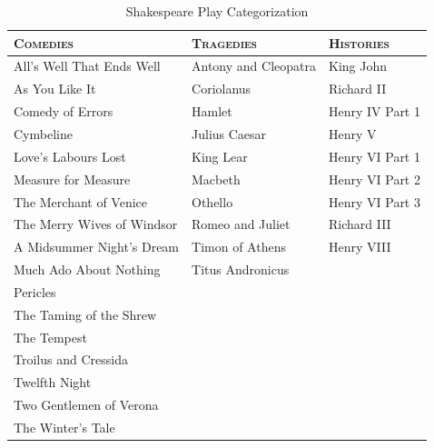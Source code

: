 \documentclass[12pt]{article} %
\begin{document}
\begin{center}
\begin{table}
\centering

\begin{tabular}{|l|l|l|}
  \hline
 \textsc{Comedies} & \textsc{Tragedies} & \textsc{Histories}\\
  \hline
  All's Well That Ends Well &  Antony and Cleopatra \hspace{8 mm} & King John \hspace{17 mm} \\

  As You Like It & Coriolanus & Richard II\\

  Comedy of Errors & Hamlet & Henry IV Part 1\\

  Cymbeline & Julius Caesar & Henry V\\

  Love's Labours Lost & King Lear & Henry VI Part 1\\

  Measure for Measure & Macbeth & Henry VI Part 2\\

  The Merchant of Venice & Othello & Henry VI Part 3\\

  The Merry Wives of Windsor & Romeo and Juliet & Richard III \\

  A Midsummer Night's Dream & Timon of Athens & Henry VIII \\

  Much Ado About Nothing & Titus Andronicus & \\

  Pericles &  & \\
  
  The Taming of the Shrew & & \\

 The Tempest & & \\

  Troilus and Cressida & & \\
  
  Twelfth Night & & \\
  
  Two Gentlemen of Verona & & \\
  
  The Winter's Tale & & \\
  \hline
\end{tabular}
	\caption{Shakespeare Play Categorization}
\end{table}
\end{center}
\end{document}
